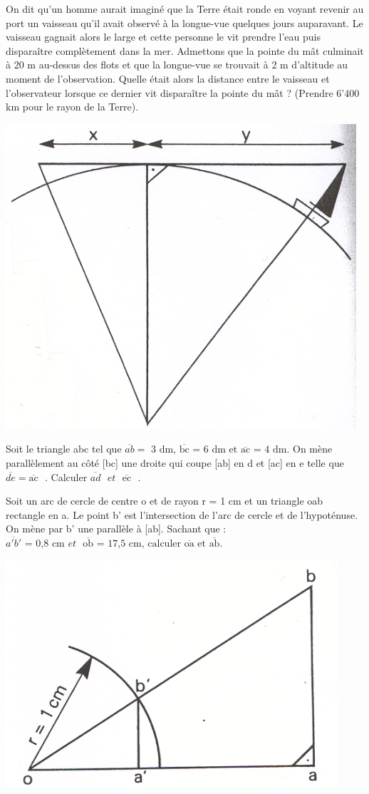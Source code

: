 \begin{exercice}
On dit qu'un homme aurait imaginé que la Terre était ronde en voyant revenir au port un vaisseau qu'il avait observé à la longue-vue quelques jours auparavant. Le vaisseau gagnait alors le large et cette personne le vit prendre l'eau puis disparaître complètement dans la mer. Admettons que la pointe du mât culminait à 20 m au-dessus des flots et que la longue-vue se trouvait à 2 m d'altitude au moment de l'observation.
Quelle était alors la distance entre le vaisseau et l'observateur lorsque ce dernier vit disparaître la pointe du mât ? 
(Prendre 6'400 km pour le rayon de la Terre).
\begin{center}
\includegraphics[width = 0.4 \textwidth]{triangle/image/pyth17.png}
\end{center}
\end{exercice}

\begin{exercice}
Soit le triangle abc tel que $\overline{ab}=\text{ 3 dm, }\overline{\text{bc}}\text{ = 6 dm et }\overline{\text{ac}}\text{ = 4 dm}$.
On mène parallèlement au côté [bc] une droite qui coupe [ab] en d et [ac] en e telle que $\overline{de}=\overline{\text{ac}}\text{ }$.
Calculer $\overline{ad}\text{ }et\text{ }\overline{\text{ec}}\text{ }$.


\end{exercice}

\begin{exercice}
Soit un arc de cercle de centre o et de rayon r = 1 cm et un triangle oab rectangle en a.
Le point b' est l'intersection de l'arc de cercle et de l'hypoténuse.
On mène par b' une parallèle à [ab]. Sachant que : $\overline{a'b'}\text{ = 0,8 cm }et\text{ }\overline{\text{ob}}\text{ = 17,5 cm, calculer }\overline{\text{oa}}\text{ et }\overline{\text{ab}}.$
\begin{center}
\includegraphics[width = 0.4 \textwidth]{triangle/image/pyth19.png}
\end{center}
\end{exercice}

